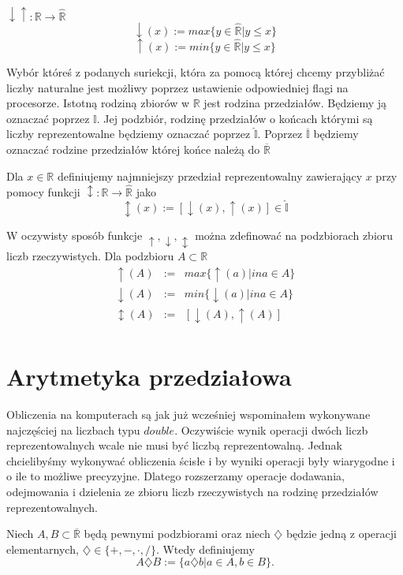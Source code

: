 $ \downarrow \uparrow : \mathbb R \to \hat{\mathbb{R}} $
$$
  \downarrow (x) := max \{ y \in \hat{\mathbb{R}} | y \leq x \}
$$
$$
  \uparrow (x) := min \{ y \in \hat{\mathbb{R}} | y \leq x \}
$$

Wybór któreś z podanych suriekcji, która za pomocą której chcemy przybliżać liczby naturalne jest możliwy poprzez 
ustawienie odpowiedniej flagi na procesorze.
Istotną rodziną zbiorów w $ \mathbb R $ jest rodzina przedziałów. Będziemy ją oznaczać poprzez $ \mathbb I $. 
Jej podzbiór, rodzinę przedziałów o końcach którymi są liczby reprezentowalne będziemy oznaczać poprzez $ \hat{\mathbb I } $.
Poprzez $ \overline { \mathbb I } $ będziemy oznaczać rodzine przedziałów której końce należą do $  \overline{\mathbb R} $

Dla $ x \in \mathbb R $ definiujemy najmniejszy przedział reprezentowalny zawierający $ x $ przy pomocy funkcji
$ \updownarrow : \mathbb R \to \hat{\mathbb R } $ jako
$$
    \updownarrow (x) := [\downarrow (x), \uparrow (x) ]\in \hat{\mathbb I } 
$$

W oczywisty sposób funkcje $ \uparrow, \downarrow, \updownarrow $ można zdefinować na podzbiorach zbioru liczb rzeczywistych.
Dla podzbioru $ A \subset \mathbb R $ 
\begin{eqnarray*}
    \uparrow (A) &:=& max \{ \uparrow (a) | in a \in A \} \\
    \downarrow (A) &:=& min \{ \downarrow (a) | in a \in A \} \\
    \updownarrow (A) &:=& [\downarrow(A),\uparrow(A)] \\
\end{eqnarray*}

\section{Arytmetyka przedziałowa}
Obliczenia na komputerach są jak już wcześniej wspominałem wykonywane najczęściej na liczbach typu $ double $.
Oczywiście wynik operacji dwóch liczb reprezentowalnych wcale nie musi być liczbą reprezentowalną.
Jednak chcielibyśmy wykonywać obliczenia ścisłe i by wyniki operacji były wiarygodne i o ile to możliwe precyzyjne.
Dlatego rozszerzamy operacje dodawania, odejmowania i dzielenia ze zbioru liczb rzeczywistych na rodzinę przedziałów 
reprezentowalnych.

Niech $ A,B  \subset \overline {\mathbb R } $ będą pewnymi podzbiorami oraz niech $ \diamondsuit $ będzie jedną z operacji elementarnych,
 $ \diamondsuit \in \{+,-,\cdot,/ \}.$ Wtedy definiujemy 
 \begin{equation}
    A \diamondsuit B := \{ a \diamondsuit b | a \in A , b \in B  \}.
 \end{equation}

